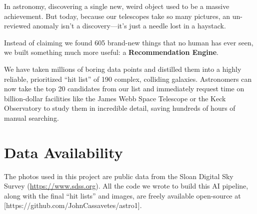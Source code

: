 \documentclass[twocolumn]{aastex631}
\begin{document}
In astronomy, discovering a single new, weird object used to be a massive achievement. But today, because our telescopes take so many pictures, an un-reviewed anomaly isn't a discovery—it's just a needle lost in a haystack. 

Instead of claiming we found 605 brand-new things that no human has ever seen, we built something much more useful: a \textbf{Recommendation Engine}. 

We have taken millions of boring data points and distilled them into a highly reliable, prioritized ``hit list'' of 190 complex, colliding galaxies. Astronomers can now take the top 20 candidates from our list and immediately request time on billion-dollar facilities like the James Webb Space Telescope or the Keck Observatory to study them in incredible detail, saving hundreds of hours of manual searching.

\section*{Data Availability}
The photos used in this project are public data from the Sloan Digital Sky Survey (\url{https://www.sdss.org}). All the code we wrote to build this AI pipeline, along with the final ``hit lists'' and images, are freely available open-source at [https://github.com/JohnCassavetes/astro1].



\end{document}
